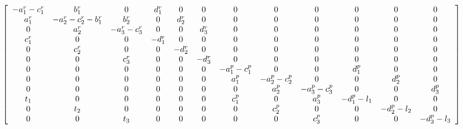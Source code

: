 \documentclass{scrartcl}
\begin{document}
\begin{landscape}
\begin{align*}
  \tiny
  &\left[ {\begin{array}{cccccccccccc}
      -a_1^r - c_1^r  & b_1^r & 0 & d_1^r & 0 & 0 & 0 & 0 & 0 & 0 & 0 & 0 \\
      a_1^r &       -a_2^r - c_2^r - b_1^r & b_2^r & 0 & d_2^r & 0 & 0 & 0 & 0 & 0 & 0 & 0 \\
      0 & a_2^r &       -a_3^r - c_3^r  & 0 & 0 & d_3^r & 0 & 0 & 0 & 0 & 0 & 0 \\
      c_1^r & 0 & 0 &       -d_1^r  & 0 & 0 & 0 & 0 & 0 & 0 & 0 & 0 \\
      0 & c_2^r & 0 & 0 &       -d_2^r  & 0 & 0 & 0 & 0 & 0 & 0 & 0 \\
      0 & 0 & c_3^r & 0 & 0 &       -d_3^r  & 0 & 0 & 0 & 0 & 0 & 0 \\
      0 & 0 & 0 & 0 & 0 & 0 &       -a_1^p- c_1^p & 0 & 0 & d_1^p & 0 & 0 \\
      0 & 0 & 0 & 0 & 0 & 0 & a_1^p &       -a_2^p - c_2^p & 0 & 0 & d_2^p & 0 \\
      0 & 0 & 0 & 0 & 0 & 0 & 0 & a_2^p &       -a_3^p - c_3^p & 0 & 0 & d_3^p \\
      t_1 & 0 & 0 & 0 & 0 & 0 & c_1^p & 0 & a_3^p &       -d_1^p - l_1 & 0 & 0 \\
      0 & t_2 & 0 & 0 & 0 & 0 & 0 & c_2^p & 0 & 0 &       -d_2^p - l_2 & 0 \\
      0 & 0 & t_3 & 0 & 0 & 0 & 0 & 0 & c_3^p & 0 & 0 &       -d_3^p - l_3   \\
\end{array} } \right]
\end{align*}
\end{landscape}
\end{document}
